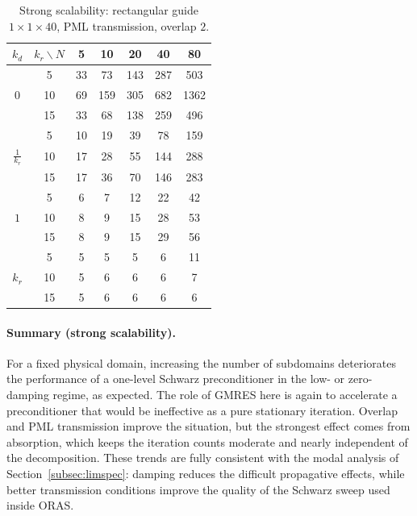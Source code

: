 \documentclass[smallextended]{svjour3}       %
\begin{document}
\begin{table}[h]
\centering
\setlength{\tabcolsep}{3pt}
\renewcommand{\arraystretch}{1.05}
\caption{Strong scalability: rectangular guide \(1\times 1\times 40\), PML transmission, overlap \(2\).}
\label{tab:strong-pml-o2}
\begin{tabular}{|c||c|c|c|c|c|c|}
\hline
$k_d$ & $ k_r \backslash N$ & 5 & 10 & 20 & 40 & 80 \\
\hline
 & 5  & 33  & 73  & 143  & 287  & 503  \\
$0$         & 10 & 69 & 159 & 305  & 682  & 1362 \\
         & 15 & 33  & 68  & 138  & 259   & 496  \\
\hline\hline
 & 5  & 10  & 19  & 39   & 78   & 159  \\
$\frac{1}{k_r}$          & 10 & 17  & 28  & 55   & 144  & 288  \\
          & 15 & 17  & 36  & 70   & 146  & 283  \\
\hline\hline
 & 5  & 6   & 7   & 12  & 22  & 42  \\
$1$      & 10 & 8  & 9  & 15  & 28  & 53  \\
      & 15 & 8  & 9  & 15  & 29  & 56   \\
\hline\hline
 & 5  & 5   & 5   & 5  & 6  & 11  \\
$k_r$      & 10 & 5  & 6  & 6  & 6  & 7  \\
      & 15 & 5  & 6  & 6  & 6  & 6  \\
\hline
\end{tabular}
\end{table}

\paragraph{Summary (strong scalability).}
For a fixed physical domain, increasing the number of subdomains deteriorates the performance of a
one-level Schwarz preconditioner in the low- or zero-damping regime, as expected. The role of
GMRES here is again to accelerate a preconditioner that would be ineffective as a pure stationary
iteration. Overlap and PML transmission improve the situation, but the strongest effect comes from
absorption, which keeps the iteration counts moderate and nearly independent of the decomposition.
These trends are fully consistent with the modal analysis of
Section~\ref{subsec:limspec}: damping reduces the difficult propagative effects, while better
transmission conditions improve the quality of the Schwarz sweep used inside ORAS.
\end{document}

